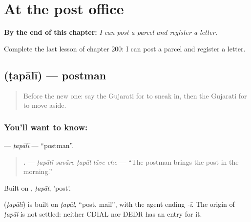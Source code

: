 
\chapter{At the post office}
\label{ch:gu-at-the-post-office}

\begin{chapteropening}
\textbf{By the end of this chapter:} \emph{I can post a parcel and register a letter.}

Complete the last lesson of chapter 200: I can post a parcel and register a letter.
\end{chapteropening}

\section[\texorpdfstring{\gu{ટપાલી} (ṭapālī)}{ટપાલી (ṭapālī)}]{ (ṭapālī) — postman}

\label{lesson:GU-C200-tapali}



\begin{quote}
Before the new one: say the Gujarati for to sneak in, then the Gujarati for to move aside.
\end{quote}

\subsection*{You'll want to know: }
\textbf{} — \emph{ṭapālī} — \textquotedblleft{}postman\textquotedblright{}.

\begin{quote}
\textbf{    .} — \emph{ṭapālī savāre ṭapāl lāve che} — \textquotedblleft{}The postman brings the post in the morning.\textquotedblright{}
\end{quote}

Built on \textbf{}, \emph{ṭapāl}, 'post'.

\begin{cousinweb}
\textbf{} (\emph{ṭapālī}) is built on \emph{ṭapāl}, \textquotedblleft{}post, mail\textquotedblright{}, with the agent ending \emph{-ī}. The origin of \emph{ṭapāl} is not settled: neither CDIAL nor DEDR has an entry for it.
\end{cousinweb}


